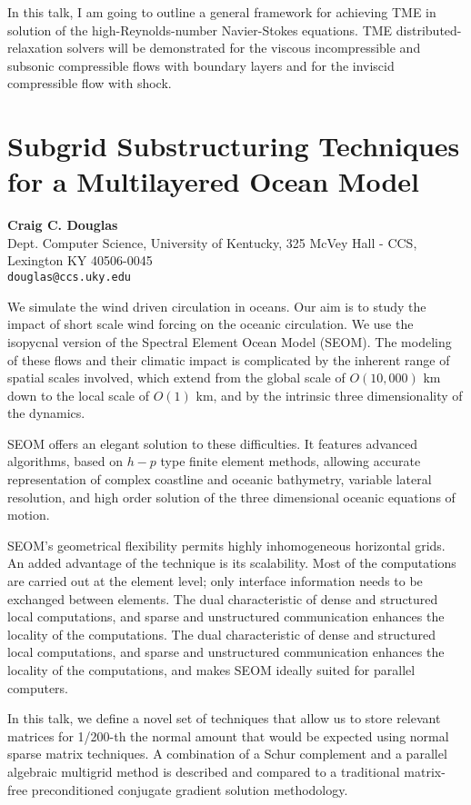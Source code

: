 \documentclass[11pt]{article}
\newcommand{\nextab}[4]{
	\section{#2}
	{\bf #1} \\ \nopagebreak
	{#3} \\ \nopagebreak
	{\tt #4} \nopagebreak
	}
\begin{document}
In this talk, I am going to outline a general framework
for achieving TME in solution of the  high-Reynolds-number Navier-Stokes
equations. TME distributed-relaxation solvers will be demonstrated for
the viscous incompressible and subsonic compressible flows with
boundary layers and for the inviscid compressible flow with shock.



\nextab
{Craig C. Douglas}
{Subgrid Substructuring Techniques for a Multilayered Ocean Model}
{Dept. Computer Science, University of Kentucky,
325 McVey Hall - CCS, Lexington KY 40506-0045}
{douglas@ccs.uky.edu}


We simulate the wind driven circulation in oceans.  Our aim
is to study the impact of short scale wind forcing on the
oceanic circulation.  We use the isopycnal version of the
Spectral Element Ocean Model (SEOM).  The modeling of these
flows and their climatic impact is complicated by the
inherent range of spatial scales involved, which extend
from the global scale of $O(10,000)$ km down to the local
scale of $O(1)$ km, and by the intrinsic three dimensionality
of the dynamics.

SEOM offers an elegant solution to these difficulties.  It
features advanced algorithms, based on $h-p$ type finite
element methods, allowing accurate representation of
complex coastline and oceanic bathymetry, variable lateral
resolution, and high order solution of the three
dimensional oceanic equations of motion.

SEOM's geometrical flexibility permits highly inhomogeneous
horizontal grids.  An added advantage of the technique is
its scalability.  Most of the computations are carried out
at the element level; only interface information needs to
be exchanged between elements.  The dual characteristic of
dense and structured local computations, and sparse and
unstructured communication enhances the locality of the
computations.  The dual characteristic of dense and
structured local computations, and sparse and unstructured
communication enhances the locality of the computations,
and makes SEOM ideally suited for parallel computers.

In this talk, we define a novel set of techniques that
allow us to store relevant matrices for 1/200-th the normal
amount that would be expected using normal sparse matrix
techniques.  A combination of a Schur complement and a
parallel algebraic multigrid method is described and
compared to a traditional matrix-free preconditioned
conjugate gradient solution methodology.
\end{document}
